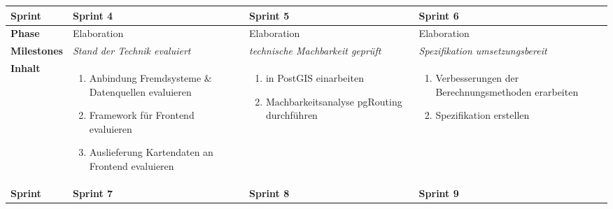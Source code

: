 \begin{landscape}
\begin{longtable}{l p{6.5cm} p{6.5cm} p{6.5cm}}
        \toprule
        \textbf{Sprint}
                                & \textbf{Sprint 4}
                                & \textbf{Sprint 5}
                                & \textbf{Sprint 6} \\
        \midrule
        \textbf{Phase}
                                & Elaboration
                                & Elaboration
                                & Elaboration \\

        \textbf{Milestones}
                                & \textit{Stand der Technik evaluiert}
                                & \textit{technische Machbarkeit geprüft}
                                & \textit{Spezifikation umsetzungsbereit}  \\

        \textbf{Inhalt}
                                & \begin{enumerate}[noitemsep]
                                    \item Anbindung Fremdsysteme \& Datenquellen evaluieren
                                    \item Framework für Frontend evaluieren
                                    \item Auslieferung Kartendaten an Frontend evaluieren
                                \end{enumerate}
                                & \begin{enumerate}[noitemsep]
                                    \item in PostGIS einarbeiten
                                    \item Machbarkeitsanalyse pgRouting durchführen
                                \end{enumerate}
                                & \begin{enumerate}[noitemsep]
                                    \item Verbesserungen der Berechnungsmethoden erarbeiten
                                    \item Spezifikation erstellen
                                \end{enumerate}  \\

        \pagebreak
        \toprule
        \textbf{Sprint}
                                & \textbf{Sprint 7}
                                & \textbf{Sprint 8}
                                & \textbf{Sprint 9} \\


\end{longtable}
\end{landscape}
